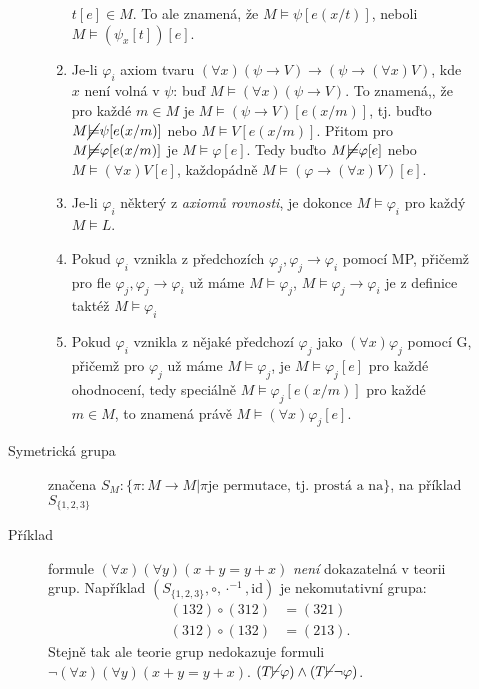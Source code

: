 \documentclass[a4paper]{article}
\begin{document}
\begin{description}
\begin{description}
\begin{enumerate}
							$t[e] \in M$. To ale znamená, že $M \models \psi[e(x/t)]$,
							neboli $M \models (\psi_x[t])[e]$.
						\item Je-li $\varphi_i$ axiom tvaru
							$(\forall x)(\psi \to V) \to (\psi \to (\forall x)V)$,
							kde $x$ není volná v $\psi$: buď $M \models (\forall x)(\psi \to V)$.
							To znamená,, že pro každé $m \in M$ je
							$M \models (\psi \to V)[e(x/m)]$, tj. buďto
							$M \cancel{\models} \psi[e(x/m)]$ nebo $M \models V[e(x/m)]$.
							Přitom pro $M \cancel{\models} \varphi[e(x/m)]$ je $M \models \varphi[e]$.
							Tedy buďto  $M \cancel{\models} \varphi[e]$ nebo $M \models (\forall x)V[e]$,
							každopádně $M \models (\varphi \to (\forall x)V)[e]$.
						\item Je-li $\varphi_i$ některý z \textit{axiomů rovnosti}, je dokonce
							$M \models \varphi_i$ pro každý $M \models L$.
						\item Pokud $\varphi_i$ vznikla z předchozích $\varphi_j, \varphi_j \to \varphi_i$ pomocí
							MP, přičemž pro fle $\varphi_j, \varphi_j \to \varphi_i$ už máme $M \models \varphi_j$,
							$M \models \varphi_j \to \varphi_i$ je z definice taktéž $M \models \varphi_i$ 
						\item Pokud $\varphi_i$ vznikla z nějaké předchozí $\varphi_j$ jako $(\forall x)\varphi_j$ 
							pomocí G, přičemž pro $\varphi_j$ už máme $M \models \varphi_j$, je
							$M \models \varphi_j[e]$ pro každé ohodnocení, tedy speciálně
							$M \models \varphi_j[e(x/m)]$ pro každé $m \in M$, to znamená
							právě $M \models (\forall x) \varphi_j[e]$.
					\end{enumerate}
				\item[Symetrická grupa] značena $S_M : \{\pi : M \to M | \pi \text{
					je permutace, tj. prostá a na}\}$, na příklad $S_{\{1, 2, 3\}}$
				\item[Příklad] formule $(\forall x)(\forall y)(x + y = y + x)$ \textit{není} dokazatelná
					v teorii grup. Například $(S_{\{1, 2, 3\}}, \circ, \cdot^{-1}, \text{id})$
					je nekomutativní grupa: \begin{align*}
						(1 3 2) \circ (3 1 2) &= (3 2 1) \\
						(3 1 2) \circ (1 3 2) &= (2 1 3)
					.\end{align*}
					Stejně tak ale teorie grup nedokazuje formuli
					$\neg (\forall x)(\forall y)(x + y = y + x)$.
					$(T \cancel{\vdash} \varphi) \land (T \cancel{\vdash} \neg \varphi)$.
			\end{description}
	\end{description}
\end{document}
